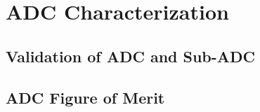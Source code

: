 \chapter{ADC Characterization}
\label{appx:latch_models}

\section{Validation of ADC and Sub-ADC}
\label{sec:validation}


\section{ADC Figure of Merit}
\label{sec:fom}
